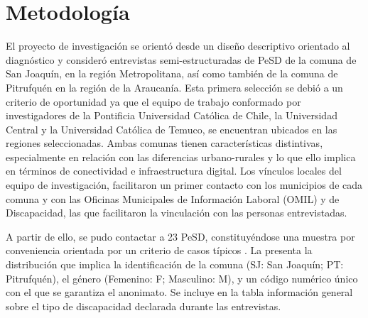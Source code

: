 \section{Metodología}\label{sec-Metodología}

El proyecto de investigación se orientó desde un diseño descriptivo
orientado al diagnóstico y consideró entrevistas semi-estructuradas de
PeSD de la comuna de San Joaquín, en la región Metropolitana, así como
también de la comuna de Pitrufquén en la región de la Araucanía. Esta
primera selección se debió a un criterio de oportunidad ya que el equipo
de trabajo conformado por investigadores de la Pontificia Universidad
Católica de Chile, la Universidad Central y la Universidad Católica de
Temuco, se encuentran ubicados en las regiones seleccionadas. Ambas
comunas tienen características distintivas, especialmente en relación
con las diferencias urbano-rurales y lo que ello implica en términos de
conectividad e infraestructura digital. Los vínculos locales del equipo
de investigación, facilitaron un primer contacto con los municipios de
cada comuna y con las Oficinas Municipales de Información Laboral (OMIL)
y de Discapacidad, las que facilitaron la vinculación con las personas
entrevistadas.

A partir de ello, se pudo contactar a 23 PeSD, constituyéndose una
muestra por conveniencia orientada por un criterio de casos típicos
\cite[p. 82]{FLICK2007}. La  presenta la distribución que implica la identificación de la comuna (SJ: San Joaquín; PT: Pitrufquén), el género (Femenino: F; Masculino: M), y un código numérico único con el que se
garantiza el anonimato. Se incluye en la tabla información general sobre
el tipo de discapacidad declarada durante las entrevistas.

